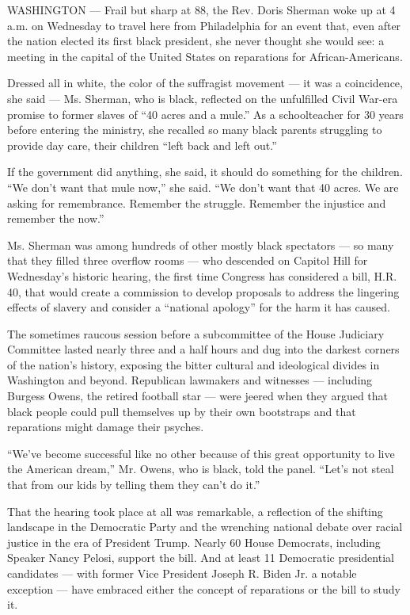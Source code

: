 WASHINGTON --- Frail but sharp at 88, the Rev. Doris Sherman woke up at
4 a.m. on Wednesday to travel here from Philadelphia for an event that,
even after the nation elected its first black president, she never
thought she would see: a meeting in the capital of the United States on
reparations for African-Americans.

Dressed all in white, the color of the suffragist movement --- it was a
coincidence, she said --- Ms. Sherman, who is black, reflected on the
unfulfilled Civil War-era promise to former slaves of ``40 acres and a
mule.'' As a schoolteacher for 30 years before entering the ministry,
she recalled so many black parents struggling to provide day care, their
children ``left back and left out.''

If the government did anything, she said, it should do something for the
children. ``We don't want that mule now,'' she said. ``We don't want
that 40 acres. We are asking for remembrance. Remember the struggle.
Remember the injustice and remember the now.''

Ms. Sherman was among hundreds of other mostly black spectators --- so
many that they filled three overflow rooms --- who descended on Capitol
Hill for Wednesday's historic hearing, the first time Congress has
considered a bill, H.R. 40, that would create a commission to develop
proposals to address the lingering effects of slavery and consider a
``national apology'' for the harm it has caused.

The sometimes raucous session before a subcommittee of the House
Judiciary Committee lasted nearly three and a half hours and dug into
the darkest corners of the nation's history, exposing the bitter
cultural and ideological divides in Washington and beyond. Republican
lawmakers and witnesses --- including Burgess Owens, the retired
football star --- were jeered when they argued that black people could
pull themselves up by their own bootstraps and that reparations might
damage their psyches.

``We've become successful like no other because of this great
opportunity to live the American dream,'' Mr. Owens, who is black, told
the panel. ``Let's not steal that from our kids by telling them they
can't do it.''

That the hearing took place at all was remarkable, a reflection of the
shifting landscape in the Democratic Party and the wrenching national
debate over racial justice in the era of President Trump. Nearly 60
House Democrats, including Speaker Nancy Pelosi, support the bill. And
at least 11 Democratic presidential candidates --- with former Vice
President Joseph R. Biden Jr. a notable exception --- have embraced
either the concept of reparations or the bill to study it.

